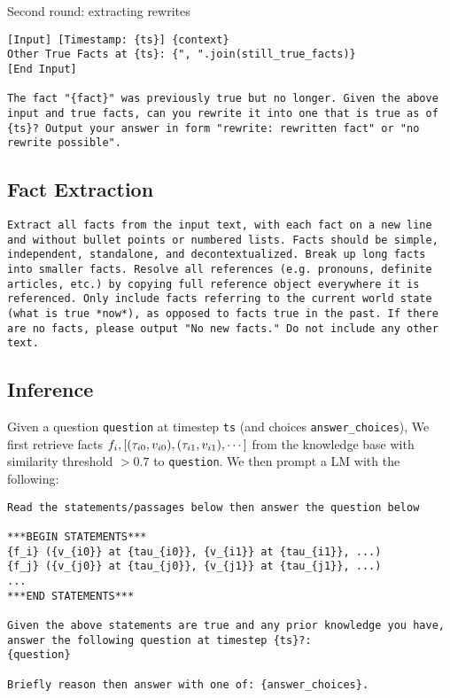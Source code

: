 Second round: extracting rewrites
\begin{lstlisting}
[Input] [Timestamp: {ts}] {context}
Other True Facts at {ts}: {", ".join(still_true_facts)}
[End Input]

The fact "{fact}" was previously true but no longer. Given the above input and true facts, can you rewrite it into one that is true as of {ts}? Output your answer in form "rewrite: rewritten fact" or "no rewrite possible".
\end{lstlisting}

\subsection{Fact Extraction}
\label{app:fact_extraction}
\begin{lstlisting}
Extract all facts from the input text, with each fact on a new line and without bullet points or numbered lists. Facts should be simple, independent, standalone, and decontextualized. Break up long facts into smaller facts. Resolve all references (e.g. pronouns, definite articles, etc.) by copying full reference object everywhere it is referenced. Only include facts referring to the current world state (what is true *now*), as opposed to facts true in the past. If there are no facts, please output "No new facts." Do not include any other text.
\end{lstlisting}

\subsection{Inference}
\label{app:infer_prompt}
Given a question \texttt{question} at timestep \texttt{ts} (and choices \texttt{answer\_choices}), 
We first retrieve facts $f_i, [(\tau_{i0}, v_{i0}), (\tau_{i1}, v_{i1}), \cdots]$ from the knowledge base with similarity threshold $> 0.7$ to \texttt{question}. We then prompt a LM with the following: 
\begin{lstlisting}
Read the statements/passages below then answer the question below

***BEGIN STATEMENTS***
{f_i} ({v_{i0}} at {tau_{i0}}, {v_{i1}} at {tau_{i1}}, ...)
{f_j} ({v_{j0}} at {tau_{j0}}, {v_{j1}} at {tau_{j1}}, ...)
...
***END STATEMENTS***

Given the above statements are true and any prior knowledge you have, answer the following question at timestep {ts}?:
{question}

Briefly reason then answer with one of: {answer_choices}.
\end{lstlisting}

